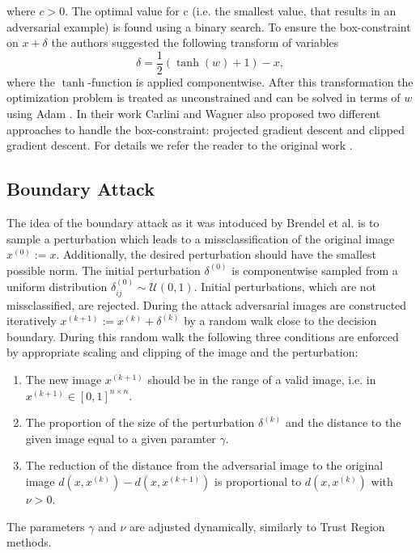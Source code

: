 \documentclass{article}
\begin{document}
where $c>0$. The optimal value for c (i.e. the smallest value, that results in an adversarial example) is found using a binary search. To ensure the box-constraint on $x+\delta$ the authors suggested the following transform of variables 
\begin{equation}
	\delta = \frac{1}{2}(\tanh(w)+1)-x,
\end{equation} 
where the $\tanh$-function is applied componentwise. After this transformation the optimization problem is treated as unconstrained and can be solved in terms of $w$ using Adam \cite{adam}. In their work Carlini and Wagner also proposed two different approaches to handle the box-constraint: projected gradient descent and clipped gradient descent. For details we refer the reader to the original work \cite{carlini}.

\subsection{Boundary Attack}

The idea of the boundary attack as it was intoduced by Brendel et al. \cite{boundary} is to sample a perturbation which leads to a missclassification of the original image $x^{(0)}:=x$. Additionally, the desired perturbation should have the smallest possible norm. The initial perturbation $\delta^{(0)}$ is componentwise sampled from a uniform distribution $\delta^{(0)}_{ij}\sim \mathcal{U}(0,1)$. Initial perturbations, which are not missclassified, are rejected. During the attack adversarial images are constructed iteratively $x^{(k+1)}:= x^{(k)}+\delta^{(k)}$ by a random walk close to the decision boundary. During this random walk the following three conditions are enforced by appropriate scaling and clipping of the image and the perturbation:
\begin{enumerate}
	\item The new image $x^{(k+1)}$ should be in the range of a valid image, i.e. in $x^{(k+1)}\in [0,1]^{n\times n}$.
	\item The proportion of the size of the perturbation $\delta^{(k)}$ and the distance to the given image equal to a given paramter $\gamma$.
	\item The reduction of the distance from the adversarial image to the original image $d(x, x^{(k)})-d(x, x^{(k+1)})$ is proportional to $d(x, x^{(k)})$ with $\nu>0$.
\end{enumerate}
The parameters $\gamma$ and $\nu$ are adjusted dynamically, similarly to Trust Region methods.
\end{document}
